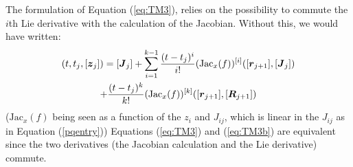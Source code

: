 \documentclass{sig-alternate-05-2015} %
\newcommand\ForAuthors[1]%
 {\par\smallskip                     %
  \begin{center}%
   \fbox%
   {\parbox{0.9\linewidth}%
    {\raggedright\sc--- #1}%
   }%
  \end{center}%
  \par\smallskip                     %
 }
\newtheorem{remark}{Remark}
\begin{document}
\label{efficientLieJacobian}

The formulation of Equation (\ref{eq:TM3}), 
relies on the possibility to commute the $i$th Lie derivative
with the calculation of the Jacobian. Without this, we would have written:
\begin{multline}
[\J](t,t_j,[{\z}_j]) = [{\J}_j] + \sum\limits_{i=1}^{k-1} \frac{(t-t_j)^i}{i !} (\mbox{Jac}_x(f))^{[i]}([{\r}_{j+1}],[{\J}_j]) \\ +  \frac{(t-t_j)^k}{k !} (\mbox{Jac}_x(f))^{[k]}([{\r}_{j+1}],[\bfm{R}_{j+1}])
\label{eq:TM3b}
\end{multline}
\noindent ($\mbox{Jac}_x(f)$ being seen as a function of the $z_i$ and $J_{ij}$, which 
is linear in the $J_{ij}$ as in Equation (\ref{pqentry}))
Equations (\ref{eq:TM3}) and (\ref{eq:TM3b}) are equivalent since the two derivatives (the Jacobian calculation
and the Lie derivative) commute.  
\end{document}

